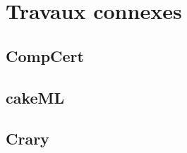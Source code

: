 %
\chapter{Travaux connexes}
\label{sec::chapitre4}

\section{CompCert}

\section{cakeML}

\section{Crary}

